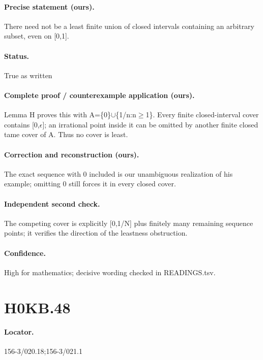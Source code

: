 \paragraph{Precise statement (ours).} There need not be a least finite union of closed intervals containing an arbitrary subset, even on [0,1].

\paragraph{Status.} True as written

\paragraph{Complete proof / counterexample application (ours).} Lemma H proves this with A=\{0\}\ensuremath{\cup}\{1/n:n\ensuremath{\geq}1\}. Every finite closed-interval cover contains [0,\ensuremath{\epsilon}]; an irrational point inside it can be omitted by another finite closed tame cover of A. Thus no cover is least.

\paragraph{Correction and reconstruction (ours).} The exact sequence with 0 included is our unambiguous realization of his example; omitting 0 still forces it in every closed cover.

\paragraph{Independent second check.} The competing cover is explicitly [0,1/N] plus finitely many remaining sequence points; it verifies the direction of the leastness obstruction.

\paragraph{Confidence.} High for mathematics; decisive wording checked in READINGS.tsv.

\section*{H0KB.48}\label{statement:H0KB.48}
\paragraph{Locator.} 156-3/020.18;156-3/021.1

